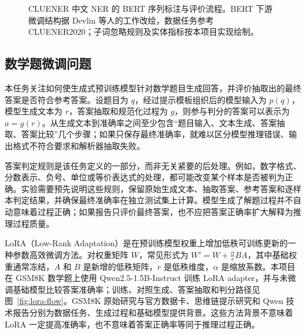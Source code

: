 \documentclass[UTF8,a4paper,12pt,fontset=none]{ctexart}
\begin{document}
\begin{figure}[htbp]
  \centering
  \caption{CLUENER 中文 NER 的 BERT 序列标注与评价流程。BERT 下游微调结构据 Devlin 等人的工作改绘，数据任务参考 CLUENER2020；子词忽略规则及实体指标按本项目实现绘制\cite{bert,cluener2020}。}
  \label{fig:ner-flow}
\end{figure}

\subsection{数学题微调问题}
本任务关注如何使生成式预训练模型针对数学题目生成回答，并评价抽取出的最终答案是否符合参考答案。设题目为 $q$，经过提示模板组织后的模型输入为 $p(q)$，模型生成文本为 $r$，答案抽取和规范化过程为 $g$，则参与判分的答案可以表示为 $a=g(r)$。从生成文本到准确率之间至少包含“题目输入、文本生成、答案抽取、答案比较”几个步骤；如果只保存最终准确率，就难以区分模型推理错误、输出格式不符合要求和解析器抽取失败。

答案判定规则是该任务定义的一部分，而非无关紧要的后处理。例如，数字格式、分数表示、负号、单位或等价表达式的处理，都可能改变某个样本是否被判为正确。实验需要预先说明这些规则，保留原始生成文本、抽取答案、参考答案和逐样本判定结果，并确保最终准确率在独立测试集上计算。模型生成了解题过程并不自动意味着过程正确；如果报告只评价最终答案，也不应把答案正确率扩大解释为推理过程质量。

LoRA（Low-Rank Adaptation）是在预训练模型权重上增加低秩可训练更新的一种参数高效微调方法。对权重矩阵 $W$，常见形式为 $W'=W+\frac{\alpha}{r}BA$，其中基础权重通常冻结，$A$ 和 $B$ 是新增的低秩矩阵，$r$ 是低秩维度，$\alpha$ 是缩放系数\cite{lora}。本项目在 GSM8K 数学题上使用 Qwen2.5-1.5B-Instruct 训练 LoRA adapter，并与未微调基础模型比较答案准确率；训练、对照生成、答案抽取和判分路径见图~\ref{fig:lora-flow}。GSM8K 原始研究与官方数据卡、思维链提示研究和 Qwen 技术报告分别为数据任务、生成过程和基础模型提供背景\cite{gsm8k,gsm8k_data,cot,qwen}。这些方法背景不意味着 LoRA 一定提高准确率，也不意味着答案正确率等同于推理过程正确。
\end{document}

